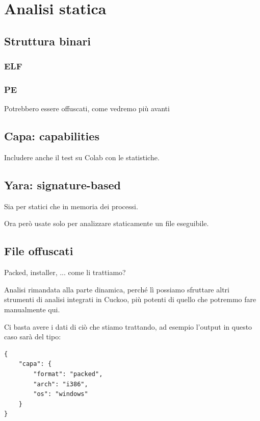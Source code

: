 \chapter{Analisi statica}

\section{Struttura binari}

\subsection{ELF}

\subsection{PE}
Potrebbero essere offuscati, come vedremo più avanti

\section{Capa: capabilities}
Includere anche il test su Colab con le statistiche.

\section{Yara: signature-based}
Sia per statici che in memoria dei processi.

Ora però usate solo per analizzare staticamente un file eseguibile.

\section{File offuscati}
Packed, installer, ... come li trattiamo?

Analisi rimandata alla parte dinamica, perché lì possiamo sfruttare altri strumenti di analisi integrati in Cuckoo, più potenti di quello che potremmo fare manualmente qui.

Ci basta avere i dati di ciò che stiamo trattando, ad esempio l'output in questo caso sarà del tipo:
\begin{code}
\label{code:json_capa_packed}
\begin{verbatim}
{
    "capa": {
        "format": "packed",
        "arch": "i386",
        "os": "windows"
    }
}
\end{verbatim}
\end{code}


